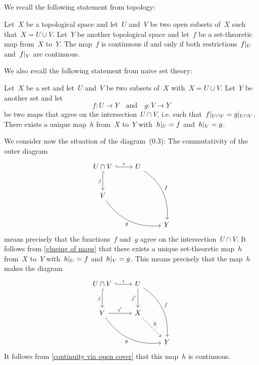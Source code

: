 \subsection{}

We recall the following statement from topology:

\begin{proposition}
	\label{continuity via open cover}
	Let~$X$ be a topological space and let~$U$ and~$V$ be two open subsets of~$X$ such that~$X = U \cup V$.
	Let~$Y$ be another topological space and let~$f$ be a set-theoretic map from~$X$ to~$Y$.
	The map~$f$ is continuous if and only if both restrictions~$f|_{U}$ and~$f|_{V}$ are continuous.
\end{proposition}

We also recall the following statement from naive set theory:

\begin{proposition}
	\label{glueing of maps}
	Let~$X$ be a set and let~$U$ and~$V$ be two subsets of~$X$ with~$X = U \cup V$.
	Let~$Y$ be another set and let
	\[
		f \colon U \to Y
		\quad\text{and}\quad
		g \colon V \to Y
	\]
	be two maps that agree on the intersection~$U \cap V$, i.e. such that~$f|_{U \cap V} = g|_{U \cap V}$.
	There exists a unique map~$h$ from~$X$ to~$Y$ with~$h|_{U} = f$ and~$h|_{V} = g$.
\end{proposition}

We consider now the situation of the diagram~(0.3):
The commutativity of the outer diagram
\[
	\begin{tikzcd}[row sep = large]
		U \cap V
		\arrow[hook]{r}[above]{i}
		\arrow[hook]{d}[left]{j}
		&
		U
		\arrow[bend left]{ddr}[above right]{f}
		&
		{}
		\\
		V
		\arrow[bend right]{drr}[below left]{g}
		&
		{}
		&
		{}
		\\
		{}
		&
		{}
		&
		Y
	\end{tikzcd}
\]
means precisely that the functions~$f$ and~$g$ agree on the intersection~$U \cap V$.
It follows from \cref{glueing of maps} that there exists a unique set-theoretic map~$h$ from~$X$ to~$Y$ with~$h|_{U} = f$ and~$h|_{V} = g$.
This means precisely that the map~$h$ makes the diagram
\[
	\begin{tikzcd}[row sep = large]
		U \cap V
		\arrow[hook]{r}[above]{i}
		\arrow[hook]{d}[left]{j}
		&
		U
		\arrow[bend left]{ddr}[above right]{f}
		\arrow{d}[left]{j'}
		&
		{}
		\\
		V
		\arrow[bend right]{drr}[below left]{g}
		\arrow{r}[above]{i'}
		&
		X
		\arrow[dashed]{dr}[above right]{h}
		&
		{}
		\\
		{}
		&
		{}
		&
		Y
	\end{tikzcd}
\]
It follows from \cref{continuity via open cover} that this map~$h$ is continuous.

